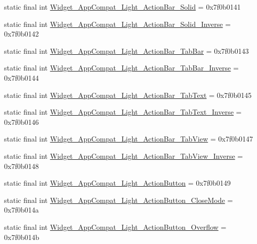 \begin{CompactItemize}
\item 
static final int \hyperlink{classandroid_1_1support_1_1v7_1_1appcompat_1_1_r_1_1style_60ed415261a7f49c7d628ccecd9766a5}{Widget\_\-AppCompat\_\-Light\_\-ActionBar\_\-Solid} = 0x7f0b0141
\item 
static final int \hyperlink{classandroid_1_1support_1_1v7_1_1appcompat_1_1_r_1_1style_73134d36e9bafe304a29126ee173027d}{Widget\_\-AppCompat\_\-Light\_\-ActionBar\_\-Solid\_\-Inverse} = 0x7f0b0142
\item 
static final int \hyperlink{classandroid_1_1support_1_1v7_1_1appcompat_1_1_r_1_1style_49261e579c0de90b1688950305691f4d}{Widget\_\-AppCompat\_\-Light\_\-ActionBar\_\-TabBar} = 0x7f0b0143
\item 
static final int \hyperlink{classandroid_1_1support_1_1v7_1_1appcompat_1_1_r_1_1style_b38d6bbc32d1c082da178e353edb4bd0}{Widget\_\-AppCompat\_\-Light\_\-ActionBar\_\-TabBar\_\-Inverse} = 0x7f0b0144
\item 
static final int \hyperlink{classandroid_1_1support_1_1v7_1_1appcompat_1_1_r_1_1style_064ab85fde532f9ba420282958882591}{Widget\_\-AppCompat\_\-Light\_\-ActionBar\_\-TabText} = 0x7f0b0145
\item 
static final int \hyperlink{classandroid_1_1support_1_1v7_1_1appcompat_1_1_r_1_1style_cc207d3ab4af47fe27b7ebebd97e22e8}{Widget\_\-AppCompat\_\-Light\_\-ActionBar\_\-TabText\_\-Inverse} = 0x7f0b0146
\item 
static final int \hyperlink{classandroid_1_1support_1_1v7_1_1appcompat_1_1_r_1_1style_b1f9aa3fa3c5596b2ac89c9c88ee2571}{Widget\_\-AppCompat\_\-Light\_\-ActionBar\_\-TabView} = 0x7f0b0147
\item 
static final int \hyperlink{classandroid_1_1support_1_1v7_1_1appcompat_1_1_r_1_1style_165f9a4d1cf6ffa7599a4041d0383e96}{Widget\_\-AppCompat\_\-Light\_\-ActionBar\_\-TabView\_\-Inverse} = 0x7f0b0148
\item 
static final int \hyperlink{classandroid_1_1support_1_1v7_1_1appcompat_1_1_r_1_1style_adb63bfc1a5d0d9b420c0dc8d613a5ed}{Widget\_\-AppCompat\_\-Light\_\-ActionButton} = 0x7f0b0149
\item 
static final int \hyperlink{classandroid_1_1support_1_1v7_1_1appcompat_1_1_r_1_1style_47a5b101206c3b0c40339f0a0a2bb7d2}{Widget\_\-AppCompat\_\-Light\_\-ActionButton\_\-CloseMode} = 0x7f0b014a
\item 
static final int \hyperlink{classandroid_1_1support_1_1v7_1_1appcompat_1_1_r_1_1style_979185960b74a6a451041b0a1ee824f9}{Widget\_\-AppCompat\_\-Light\_\-ActionButton\_\-Overflow} = 0x7f0b014b

\end{CompactItemize}
